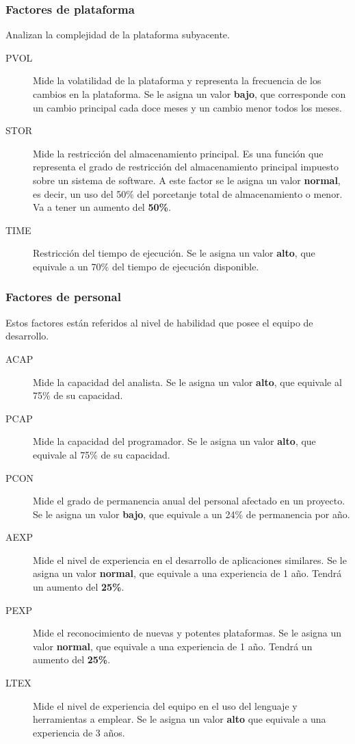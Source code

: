 \documentclass[11pt,a4paper,spanish,twoside]{book}
\begin{document}
\subsubsection{Factores de plataforma}
Analizan la complejidad de la plataforma subyacente.
\begin{description}
\item[PVOL] Mide la volatilidad de la plataforma y representa la frecuencia de
  los cambios en la plataforma. Se le asigna un valor \textbf{bajo}, que
  corresponde con un cambio principal cada doce meses y un cambio menor todos
  los meses.

\item[STOR] Mide la restricción del almacenamiento principal. Es una función
  que representa el grado de restricción del almacenamiento principal
  impuesto sobre un sistema de software. A este factor se le asigna un valor
  \textbf{normal}, es decir, un uso del 50\% del porcetanje total de
  almacenamiento o menor. Va a tener un aumento del \textbf{50\%}.

\item[TIME] Restricción del tiempo de ejecución. Se le asigna un valor
  \textbf{alto}, que equivale a un 70\% del tiempo de ejecución disponible.
\end{description}

\subsubsection{Factores de personal}
Estos factores están referidos al nivel de habilidad que posee el equipo de
desarrollo.
\begin{description}
\item[ACAP] Mide la capacidad del analista. Se le asigna un valor
\textbf{alto}, que equivale al 75\% de su capacidad.
\item[PCAP] Mide la capacidad del programador. Se le asigna un valor
\textbf{alto}, que equivale al 75\% de su capacidad.
\item[PCON] Mide el grado de permanencia anual del personal afectado en un
proyecto. Se le asigna un valor \textbf{bajo}, que equivale a un 24\% de
permanencia por año.
\item[AEXP] Mide el nivel de experiencia en el desarrollo de aplicaciones
similares. Se le asigna un valor \textbf{normal}, que equivale a una
experiencia de 1 año. Tendrá un aumento del \textbf{25\%}.
\item[PEXP] Mide el reconocimiento de nuevas y potentes plataformas. Se le
asigna un valor \textbf{normal}, que equivale a una experiencia de 1
año. Tendrá un aumento del \textbf{25\%}. 
\item[LTEX] Mide el nivel de experiencia del equipo en el uso del lenguaje y
herramientas a emplear. Se le asigna un valor \textbf{alto} que equivale a una
experiencia de 3 años.
\end{description}
\end{document}
